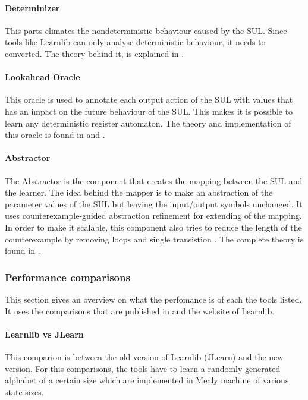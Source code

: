 \documentclass[multi,crop=false,class=article]{standalone}
\begin{document}
\paragraph{Determinizer}
This parts elimates the nondeterministic behaviour caused by the SUL. Since 
tools like Learnlib can only analyse deterministic behaviour, it needs to 
converted. The theory behind it, is explained in \cite{Aarts2015}.

\paragraph{Lookahead Oracle}
This oracle is used to annotate each output action of the SUL with values that 
has an impact on the future behaviour of the SUL. This makes it is possible to 
learn any deterministic register automaton. The theory and implementation of 
this oracle is found in \cite{Aarts2014} and \cite{tomte14}.

\paragraph{Abstractor}
The Abstractor is the component that creates the mapping between the SUL and 
the learner. The idea behind the mapper is to make an abstraction of the 
parameter values of the SUL but leaving the input/output symbols unchanged. It 
uses counterexample-guided abstraction refinement\cite{tomte14} for extending 
of the mapping. In order to make it scalable, this component also tries to 
reduce the length of the counterexample by removing loops and single 
transistion \cite{Koopman2014}. The complete theory is found in \cite{tomte14}.

\subsubsection{Performance comparisons}
\label{ssec:performance_compare}
This section gives an overview on what the perfomance is of each the tools 
listed. It uses the comparisons that are published in 
\cite{Aarts2014}\cite{Aarts2015} and 
the website of 
Learnlib.

\paragraph{Learnlib vs JLearn}

\todo{Image of comparison between Learnlib and JLearn] } 
This comparion is between the old version of Learnlib (JLearn) and the new 
version. For this comparisons, the tools have to learn a randomly generated 
alphabet of a certain size which are implemented in Mealy machine of various 
state sizes.
\end{document}
